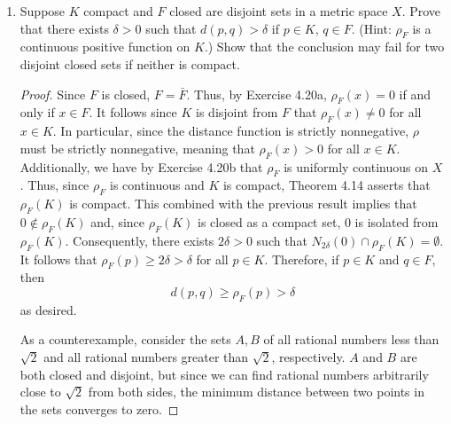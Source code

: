 \documentclass[../psets.tex]{subfiles}
\begin{document}
\begin{enumerate}[label={\textbf{\arabic*.}}]
\begin{enumerate}
\begin{proof}
\begin{align*}
                \rho_E(x) &\leq d(x,y)+\rho_E(y)\\
                \rho_E(x)-\rho_E(y) &\leq d(x,y)
            \end{align*}
            Interchanging the roles of $x$ and $y$ in the above algebra yields
            \begin{equation*}
                \rho_E(y)-\rho_E(x) \leq d(y,x) = d(x,y)
            \end{equation*}
            Therefore, we have that
            \begin{equation*}
                |\rho_E(x)-\rho_E(y)| \leq d(x,y)
            \end{equation*}
            It follows that if we want $|\rho_E(x)-\rho_E(y)|<\epsilon$, we need only require that $d(x,y)<\delta=\epsilon$, so $\rho_E$ is uniformly continuous, as desired.
        \end{proof}
    \end{enumerate}
    \item Suppose $K$ compact and $F$ closed are disjoint sets in a metric space $X$. Prove that there exists $\delta>0$ such that $d(p,q)>\delta$ if $p\in K$, $q\in F$. (Hint: $\rho_F$ is a continuous positive function on $K$.) Show that the conclusion may fail for two disjoint closed sets if neither is compact.
    \begin{proof}
        Since $F$ is closed, $F=\bar{F}$. Thus, by Exercise 4.20a, $\rho_F(x)=0$ if and only if $x\in F$. It follows since $K$ is disjoint from $F$ that $\rho_F(x)\neq 0$ for all $x\in K$. In particular, since the distance function is strictly nonnegative, $\rho$ must be strictly nonnegative, meaning that $\rho_F(x)>0$ for all $x\in K$. Additionally, we have by Exercise 4.20b that $\rho_F$ is uniformly continuous on $X$. Thus, since $\rho_F$ is continuous and $K$ is compact, Theorem 4.14 asserts that $\rho_F(K)$ is compact. This combined with the previous result implies that $0\notin\rho_F(K)$ and, since $\rho_F(K)$ is closed as a compact set, 0 is isolated from $\rho_F(K)$. Consequently, there exists $2\delta>0$ such that $N_{2\delta}(0)\cap\rho_F(K)=\emptyset$. It follows that $\rho_F(p)\geq 2\delta>\delta$ for all $p\in K$. Therefore, if $p\in K$ and $q\in F$, then
        \begin{equation*}
            d(p,q) \geq \rho_F(p) >\delta
        \end{equation*}
        as desired.\par
        As a counterexample, consider the sets $A,B$ of all rational numbers less than $\sqrt{2}$ and all rational numbers greater than $\sqrt{2}$, respectively. $A$ and $B$ are both closed and disjoint, but since we can find rational numbers arbitrarily close to $\sqrt{2}$ from both sides, the minimum distance between two points in the sets converges to zero.

\end{proof}
\end{enumerate}
\end{document}
